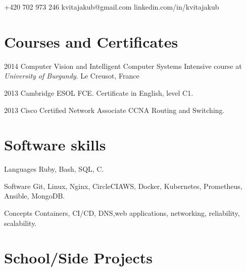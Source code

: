 \documentclass{tccv}
\begin{document}
{+420 702 973 246}
{kvitajakub@gmail.com}
{linkedin.com/in/kvitajakub}

\section{Courses and Certificates}

\begin{yearlist}
	
	\item{2014}
	{Computer Vision and Intelligent Computer Systems}
	{Intensive course at \emph{University of Burgundy}. Le Creusot, France}
	
	\item{2013}
	{Cambridge ESOL FCE.}
	{Certificate in English, level C1.}
	
	\item{2013}
	{Cisco Certified Network Associate}
	{CCNA Routing and Switching.}
	
\end{yearlist}

\section{Software skills}

\begin{factlist}
	
	\item{Languages}
	{Ruby, Bash, SQL, C.}
	
	\item{Software}
	{Git, Linux, Nginx, CircleCI\newline AWS, Docker, Kubernetes, Prometheus, Ansible, MongoDB.}
	
	\item{Concepts}
	{Containers, CI/CD, DNS,\newline web applications, networking, reliability, scalability.}
	
\end{factlist}

\section{School/Side Projects}
\end{document}
